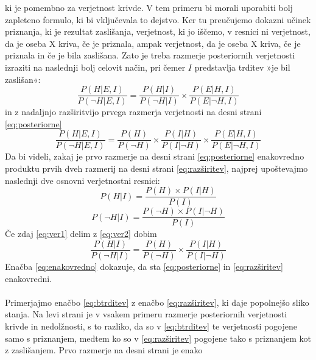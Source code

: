 \documentclass[12pt,a4paper]{amsart}
\theoremstyle{definition} %
\theoremstyle{plain} %
\begin{document}
ki je pomembno za verjetnost krivde. V tem primeru bi morali uporabiti bolj zapleteno formulo, ki bi vključevala to dejstvo. Ker tu preučujemo 
dokazni učinek priznanja, ki je rezultat zaslišanja, verjetnost, ki jo iščemo, v resnici ni verjetnost, da je oseba X kriva, če je priznala, 
ampak verjetnost, da je oseba X kriva, če je priznala in če je bila zaslišana. Zato je treba razmerje posteriornih verjetnosti izraziti na 
naslednji bolj celovit način, pri čemer $I$ predstavlja trditev »je bil zaslišan«:
\begin{equation}\label{eq:posteriorne}
    \frac{P(H \lvert E, I)}{P(\neg H \lvert E, I)} = \frac{P(H \lvert I)}{P(\neg H \lvert I)}  \times \frac{P(E \lvert H, I)}{P(E \lvert \neg H, I)}
\end{equation}
in z nadaljnjo razširitvijo prvega razmerja verjetnosti na desni strani \eqref{eq:posteriorne}
\begin{equation}\label{eq:razširitev}
    \frac{P(H \lvert E, I)}{P(\neg H \lvert E, I)} = \frac{P(H)}{P(\neg H)} \times \frac{P(I \lvert H)}{P(I \lvert \neg H)}  \times \frac{P(E \lvert H, I)}{P(E \lvert \neg H, I)}
\end{equation}
Da bi videli, zakaj je prvo razmerje na desni strani \eqref{eq:posteriorne} enakovredno produktu prvih dveh razmerij na desni strani \eqref{eq:razširitev}, najprej upoštevajmo naslednji dve osnovni verjetnostni resnici:
\begin{equation}\label{eq:ver1}
    P(H \lvert I) = \frac{P(H) \times P(I \lvert H)}{P(I)}
\end{equation}
\begin{equation}\label{eq:ver2}
    P(\neg H \lvert I) = \frac{P(\neg H) \times P(I \lvert \neg H)}{P(I)}
\end{equation}
Če zdaj \eqref{eq:ver1} delim z \eqref{eq:ver2} dobim
\begin{equation}\label{eq:enakovredno}
    \frac{P(H \lvert I)}{P(\neg H \lvert I)} = \frac{P(H)}{P(\neg H)}  \times \frac{P(I \lvert H)}{P(I \lvert \neg H)}
\end{equation}
Enačba \eqref{eq:enakovredno} dokazuje, da sta \eqref{eq:posteriorne} in \eqref{eq:razširitev} enakovredni.\\\\
Primerjajmo enačbo \eqref{eq:btrditev} z enačbo \eqref{eq:razširitev}, ki daje popolnejšo sliko stanja. Na levi strani je v vsakem primeru razmerje posteriornih verjetnosti krivde in nedolžnosti, s to 
razliko, da so v \eqref{eq:btrditev} te verjetnosti pogojene samo s priznanjem, medtem ko so v \eqref{eq:razširitev} pogojene tako s priznanjem kot z zaslišanjem. Prvo razmerje na desni strani je enako 
\end{document}
